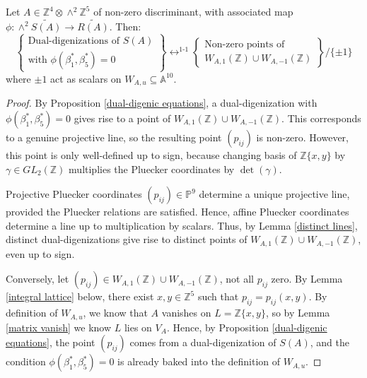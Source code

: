 \documentclass{report}
\begin{document}
\begin{corollary} \label{integral variety}
Let $A \in \mathbb{Z}^4 \otimes \wedge^2 \mathbb{Z}^5$ of non-zero discriminant, with associated map $\phi : \wedge^2 \tilde{S(A)} \to \tilde{R(A)}$.  Then:
\begin{equation}
\left \{ 
\begin{array}{l}
\text{Dual-digenizations of } S(A) \\
\text{with } \phi(\beta_1^*,\beta_5^*) = 0
\end{array}
\right \}
\leftrightarrow^{\text{1-1}}
\left \{
\begin{array}{l}
\text{Non-zero points of } \\
W_{A,1}(\mathbb{Z}) \cup W_{A,-1}(\mathbb{Z})
\end{array}
\right \} / \{\pm 1 \}
\end{equation}
where $\pm 1$ act as scalars on $W_{A,u} \subseteq \mathbb{A}^{10}$.
\end{corollary}
\begin{proof}
By Proposition \ref{dual-digenic equations}, a dual-digenization with $\phi(\beta_1^*,\beta_5^*) = 0$ gives rise to a point of $W_{A,1}(\mathbb{Z}) \cup W_{A,-1}(\mathbb{Z})$.  This corresponds to a genuine projective line, so the resulting point $(p_{ij})$ is non-zero.  However, this point is only well-defined up to sign, because changing basis of $\mathbb{Z}\{x,y\}$ by $\gamma \in GL_2(\mathbb{Z})$ multiplies the Pluecker coordinates by $\det(\gamma)$.  

Projective Pluecker coordinates $(p_{ij}) \in \mathbb{P}^9$ determine a unique projective line, provided the Pluecker relations are satisfied.  Hence, affine Pluecker coordinates determine a line up to multiplication by scalars.  Thus, by Lemma \ref{distinct lines}, distinct dual-digenizations give rise to distinct points of $W_{A,1}(\mathbb{Z}) \cup W_{A,-1}(\mathbb{Z})$, even up to sign.

Conversely, let $(p_{ij}) \in W_{A,1}(\mathbb{Z}) \cup W_{A,-1}(\mathbb{Z})$, not all $p_{ij}$ zero.  By Lemma \ref{integral lattice} below, there exist $x,y \in \mathbb{Z}^5$ such that $p_{ij} = p_{ij}(x,y)$.  By definition of $W_{A,u}$, we know that $A$ vanishes on $L = \mathbb{Z}\{x,y\}$, so by Lemma \ref{matrix vanish} we know $L$ lies on $V_A$.  Hence, by Proposition \ref{dual-digenic equations}, the point $(p_{ij})$ comes from a dual-digenization of $S(A)$, and the condition $\phi(\beta_1^*,\beta_5^*) = 0$ is already baked into the definition of $W_{A,u}$.
\end{proof}
\end{document}
